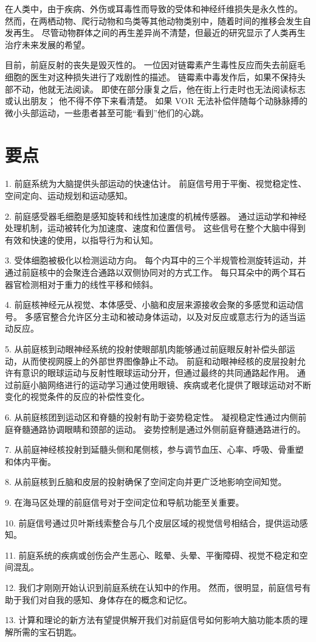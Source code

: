 在人类中，由于疾病、外伤或耳毒性而导致的受体和神经纤维损失是永久性的。
然而，在两栖动物、爬行动物和鸟类等其他动物类别中，随着时间的推移会发生自发再生。
尽管动物群体之间的再生差异尚不清楚，但最近的研究显示了人类再生治疗未来发展的希望。


目前，前庭反射的丧失是毁灭性的。
一位因对链霉素产生毒性反应而失去前庭毛细胞的医生对这种损失进行了戏剧性的描述。
链霉素中毒发作后，如果不保持头部不动，他就无法阅读。
即使在部分康复之后，他在街上行走时也无法阅读标志或认出朋友；
他不得不停下来看清楚。
如果 VOR 无法补偿伴随每个动脉脉搏的微小头部运动，一些患者甚至可能“看到”他们的心跳。


\section{要点}

1. 前庭系统为大脑提供头部运动的快速估计。
前庭信号用于平衡、视觉稳定性、空间定向、运动规划和运动感知。


2. 前庭感受器毛细胞是感知旋转和线性加速度的机械传感器。
通过运动学和神经处理机制，运动被转化为加速度、速度和位置信号。
这些信号在整个大脑中得到有效和快速的使用，以指导行为和认知。


3. 受体细胞被极化以检测运动方向。
每个内耳中的三个半规管检测旋转运动，并通过前庭核中的会聚连合通路以双侧协同对的方式工作。
每只耳朵中的两个耳石器官检测相对于重力的线性平移和倾斜。


4. 前庭核神经元从视觉、本体感受、小脑和皮层来源接收会聚的多感觉和运动信号。
多感官整合允许区分主动和被动身体运动，以及对反应或意志行为的适当运动反应。


5. 从前庭核到动眼神经系统的投射使眼部肌肉能够通过前庭眼反射补偿头部运动，从而使视网膜上的外部世界图像静止不动。
前庭和动眼神经核的皮层投射允许有意识的眼球运动与反射性眼球运动分开，但通过最终的共同通路起作用。
通过前庭小脑网络进行的运动学习通过使用眼镜、疾病或老化提供了眼球运动对不断变化的视觉条件的反应的补偿性变化。


6. 从前庭核团到运动区和脊髓的投射有助于姿势稳定性。
凝视稳定性通过内侧前庭脊髓通路协调眼睛和颈部的运动。
姿势控制是通过外侧前庭脊髓通路进行的。


7. 从前庭神经核投射到延髓头侧和尾侧核，参与调节血压、心率、呼吸、骨重塑和体内平衡。


8. 从前庭核到丘脑和皮层的投射确保了空间定向并更广泛地影响空间知觉。


9. 在海马区处理的前庭信号对于空间定位和导航功能至关重要。


10. 前庭信号通过贝叶斯线索整合与几个皮层区域的视觉信号相结合，提供运动感知。


11. 前庭系统的疾病或创伤会产生恶心、眩晕、头晕、平衡障碍、视觉不稳定和空间混乱。


12. 我们才刚刚开始认识到前庭系统在认知中的作用。 然而，很明显，前庭信号有助于我们对自我的感知、身体存在的概念和记忆。


13. 计算和理论的新方法有望提供解开我们对前庭信号如何影响大脑功能本质的理解所需的宝石钥匙。




